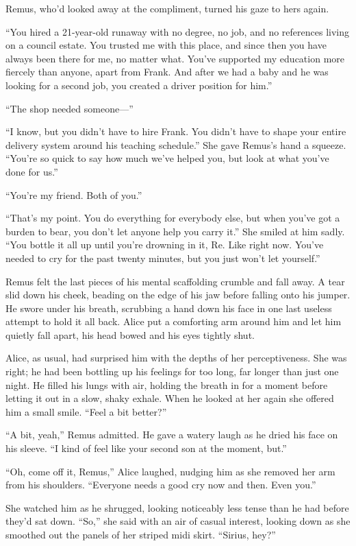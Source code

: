 Remus, who’d looked away at the compliment, turned his gaze to hers again.

“You hired a 21-year-old runaway with no degree, no job, and no references living on a council estate. You trusted me with this place, and since then you have always been there for me, no matter what. You’ve supported my education more fiercely than anyone, apart from Frank. And after we had a baby and he was looking for a second job, you created a driver position for him.”

“The shop needed someone—”

“I know, but you didn’t have to hire Frank. You didn’t have to shape your entire delivery system around his teaching schedule.” She gave Remus’s hand a squeeze. “You’re so quick to say how much we’ve helped you, but look at what you’ve done for us.”

“You’re my friend. Both of you.”

“That’s my point. You do everything for everybody else, but when you’ve got a burden to bear, you don’t let anyone help you carry it.” She smiled at him sadly. “You bottle it all up until you’re drowning in it, Re. Like right now. You’ve needed to cry for the past twenty minutes, but you just won’t let yourself.”

Remus felt the last pieces of his mental scaffolding crumble and fall away. A tear slid down his cheek, beading on the edge of his jaw before falling onto his jumper. He swore under his breath, scrubbing a hand down his face in one last useless attempt to hold it all back. Alice put a comforting arm around him and let him quietly fall apart, his head bowed and his eyes tightly shut.

Alice, as usual, had surprised him with the depths of her perceptiveness. She was right; he had been bottling up his feelings for too long, far longer than just one night. He filled his lungs with air, holding the breath in for a moment before letting it out in a slow, shaky exhale. When he looked at her again she offered him a small smile. “Feel a bit better?”

“A bit, yeah,” Remus admitted. He gave a watery laugh as he dried his face on his sleeve. “I kind of feel like your second son at the moment, but.”

“Oh, come off it, Remus,” Alice laughed, nudging him as she removed her arm from his shoulders. “Everyone needs a good cry now and then. Even you.”

She watched him as he shrugged, looking noticeably less tense than he had before they’d sat down. “So,” she said with an air of casual interest, looking down as she smoothed out the panels of her striped midi skirt. “Sirius, hey?”

